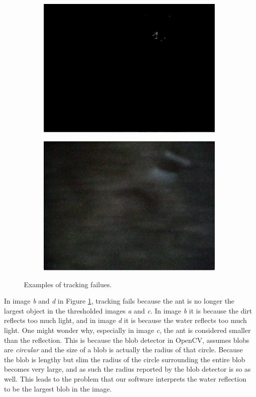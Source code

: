 \begin{figure}
\begin{subfigure}[b]{0.35\textwidth}
                \caption{}
        \end{subfigure}\\ \mbox{}\\
        \begin{subfigure}[b]{0.35\textwidth}
                \includegraphics[scale = 0.3]{img/bad4t}
                \caption{}
        \end{subfigure}
		\quad
        \begin{subfigure}[b]{0.35\textwidth}
                \includegraphics[scale = 0.3]{img/bad4}
                \caption{}
        \end{subfigure}
		\caption{Examples of tracking failues.}
		\label{fig:ant_fail}
\end{figure}

In image \emph{b} and \emph{d} in Figure \ref{fig:ant_fail}, tracking fails because the ant is no longer the largest object in the thresholded images \emph{a} and \emph{c}. In image \emph{b} it is because the dirt reflects too much light, and in image \emph{d} it is because the water reflects too much light. One might wonder why, especially in image \emph{c}, the ant is considered smaller than the reflection. This is because the blob detector in OpenCV, assumes blobs are \emph{circular} and the size of a blob is actually the radius of that circle. Because the blob is lengthy but slim the radius of the circle surrounding the entire blob becomes very large, and as such the radius reported by the blob detector is so as well. This leads to the problem that our software interprets the water reflection to be the largest blob in the image. \\


